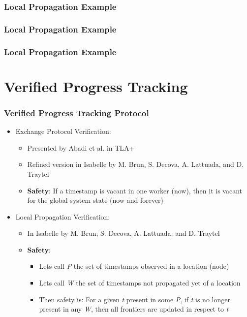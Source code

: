\documentclass{beamer}
\begin{document}
\begin{frame}
  \frametitle{Local Propagation Example}
  \begin{center}
    
  \end{center}
\end{frame}

\begin{frame}
  \frametitle{Local Propagation Example}
  \begin{center}
    
  \end{center}
\end{frame}

\begin{frame}
  \frametitle{Local Propagation Example}
  \begin{center}
    
  \end{center}
\end{frame}

\section{Verified Progress Tracking}

\begin{frame}
  \frametitle{Verified Progress Tracking Protocol}
  \begin{itemize}
    \item Exchange Protocol Verification:
          \begin{itemize}
            \item Presented by Abadi et al. in TLA+
            \item Refined version in Isabelle by M. Brun, S. Decova, A. Lattuada, and D. Traytel
            \item \textbf{Safety}: If a timestamp is vacant in one worker (now), then it is vacant for the global system state (now and forever)
          \end{itemize}
          \pause
    \item Local Propagation Verification:
          \begin{itemize}
            \item In Isabelle by M. Brun, S. Decova, A. Lattuada, and D. Traytel
            \item \textbf{Safety}:
                  \begin{itemize}
                    \item Lets call \textit{P} the set of timestamps observed in a location (node)
                    \item Lets call \textit{W} the set of timestamps not propagated yet of a location
                    \item Then safety is: For a given \textit{t} present in some \textit{P}, if \textit{t} is no longer present in any \textit{W}, then all frontiers are updated in respect to \textit{t}
                  \end{itemize}
          \end{itemize}
  \end{itemize}
\end{frame}
\end{document}
